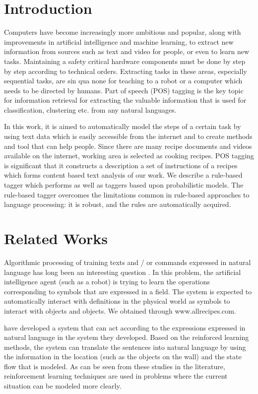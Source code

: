 
\section{Introduction}
Computers have become increasingly more ambitious and popular, along with improvements in artificial intelligence and machine learning, to extract new information from sources such as text and video for people, or even to learn new tasks. Maintaining a safety critical hardware components must be done by step by step according to technical orders. Extracting tasks in these areas, especially sequential tasks, are sin qua none for teaching to a robot or a computer which needs to be directed by humans.  Part of speech (POS) tagging is the key topic for information retrieval for extracting the valuable information that is used for classification, clustering etc. from any natural languages. 

In this work, it is aimed to automatically model the steps of a certain task by using text data which is easily accessible from the internet and to create methods and tool that can help people. Since there are many recipe documents and videos available on the internet,  working area is selected as cooking recipes. POS tagging is significant that  it constructs a description a set of instructions of a recipes which forms content based text analysis of our work. We describe a rule-based tagger which
performs as well as taggers based upon probabilistic models. The rule-based tagger overcomes the limitations common in rule-based approaches to language processing: it is robust, and the rules are automatically acquired.


\section{Related Works}

Algorithmic processing of training texts and / or commands expressed in natural language has long been an interesting question \cite{harnad90}. In this problem, the artificial intelligence agent (such as a robot) is trying to learn the operations corresponding to symbols that are expressed in a field. The system is expected to automatically interact with definitions in the physical world as symbols to interact with objects and objects. We obtained through www.allrecipes.com.

\cite{chen2011learning} have developed a system that can act according to the expressions expressed in natural language in the system they developed. Based on the reinforced learning methods, the system can translate the sentences into natural language by using the information in the location (such as the objects on the wall) and the state flow that is modeled. As can be seen from these studies in the literature, reinforcement learning techniques are used in problems where the current situation can be modeled more clearly.

